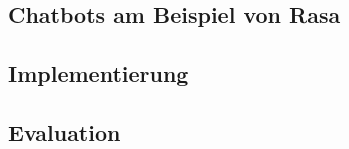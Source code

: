 \begin{spacing}{1}
\chapter{Chatbots am Beispiel von Rasa}\label{chapter:chatbots}
\end{spacing}


\begin{spacing}{1}
\chapter{Implementierung}
\end{spacing}


\begin{spacing}{1}
\chapter{Evaluation}
\end{spacing}



\newpage
{}
\setcounter{page}{\value{RPages}}

\glsnogroupskiptrue
\printglossary[title=Glossar,toctitle=Glossar] %
\listoffigures
\listoftables
\lstlistoflistings
\appendix
{}



